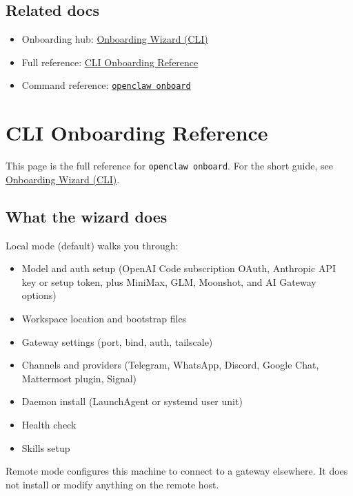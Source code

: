 \subsection{Related docs}


\begin{itemize}
  \item Onboarding hub: \href{/start/wizard}{Onboarding Wizard (CLI)}
  \item Full reference: \href{/start/wizard-cli-reference}{CLI Onboarding Reference}
  \item Command reference: \href{/cli/onboard}{\texttt{openclaw onboard}}
\end{itemize}



\clearpage

\section{CLI Onboarding Reference}


This page is the full reference for \texttt{openclaw onboard}.
For the short guide, see \href{/start/wizard}{Onboarding Wizard (CLI)}.

\subsection{What the wizard does}


Local mode (default) walks you through:

\begin{itemize}
  \item Model and auth setup (OpenAI Code subscription OAuth, Anthropic API key or setup token, plus MiniMax, GLM, Moonshot, and AI Gateway options)
  \item Workspace location and bootstrap files
  \item Gateway settings (port, bind, auth, tailscale)
  \item Channels and providers (Telegram, WhatsApp, Discord, Google Chat, Mattermost plugin, Signal)
  \item Daemon install (LaunchAgent or systemd user unit)
  \item Health check
  \item Skills setup
\end{itemize}


Remote mode configures this machine to connect to a gateway elsewhere.
It does not install or modify anything on the remote host.

